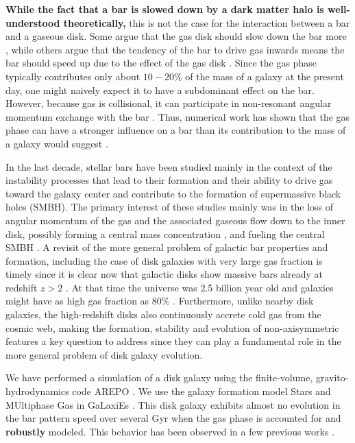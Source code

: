 \documentclass[twocolumn,linenumbers,trackchanges]{aastex631}
\newcommand{\AREPO}{\textsc{AREPO}}
\newcommand{\SMUGGLE}{SMUGGLE}
\begin{document}
{\bf While the fact that a bar is slowed down by a dark matter halo is
well-understood theoretically,} this is not the case for the interaction between
a bar and a gaseous disk. Some argue that the gas disk should slow down the bar
more \citep{2003MNRAS.341.1179A}, while others argue that the tendency of the
bar to drive gas inwards means the bar should speed up due to the effect of the
gas disk \citep{2013MNRAS.429.1949A, 2014MNRAS.438L..81A}. Since the gas phase
typically contributes only about $10-20\%$ of the mass of a galaxy at the
present day, one might naively expect it to have a subdominant effect on the
bar. However, because gas is collisional, it can participate in non-resonant
angular momentum exchange with the bar \citep{2011MNRAS.415.1027H}. Thus,
numerical work has shown that the gas phase can have a stronger influence on a
bar than its contribution to the mass of a galaxy would suggest
\citep{2010ApJ...719.1470V, 2013MNRAS.429.1949A}.


In the last decade, stellar bars have been studied mainly in the context of the
instability processes that lead to their formation and their ability to drive
gas toward the galaxy center and contribute to the formation of supermassive
black holes (SMBH). The primary interest of these studies mainly was in the loss
of angular momentum of the gas and the associated  gaseous flow down to the
inner disk, possibly forming a central mass concentration
\citep{2010ApJ...719.1470V}, and fueling the central SMBH
\citep[e.g.][]{1989Natur.338...45S, 1990Natur.345..679S}. A revisit of the more
general problem of galactic bar properties and formation, including the case of
disk galaxies with very large gas fraction is timely since it is clear now that
galactic disks show massive bars already at redshift $z>2$
\citep{2022arXiv221008658G}. At that time the universe was 2.5 billion year old
and galaxies might have as high gas fraction as 80\% \citep{2020ARAA..58..157T}.
Furthermore, unlike nearby disk galaxies, the high-redshift disks also
continuously accrete cold gas from the cosmic web, making the formation,
stability and evolution of non-axisymmetric features a key question to address
since they can play a fundamental role in the more general problem of disk
galaxy evolution.



We have performed a simulation of a disk galaxy using the finite-volume,
gravito-hydrodynamics code \AREPO{} \citep{2010MNRAS.401..791S}. We use the
galaxy formation model Stars and MUltiphase Gas in GaLaxiEs
\citep[\SMUGGLE{};][]{2019MNRAS.489.4233M}. This disk galaxy exhibits almost no
evolution in the bar pattern speed over several Gyr when the gas phase is
accounted for and {\bf robustly} modeled. This behavior has been observed in a
few previous works \citep{1993AA...268...65F, 2007ApJ...666..189B,
2009ApJ...707..218V, 2010ApJ...719.1470V, 2014MNRAS.438L..81A}. 
\end{document}
